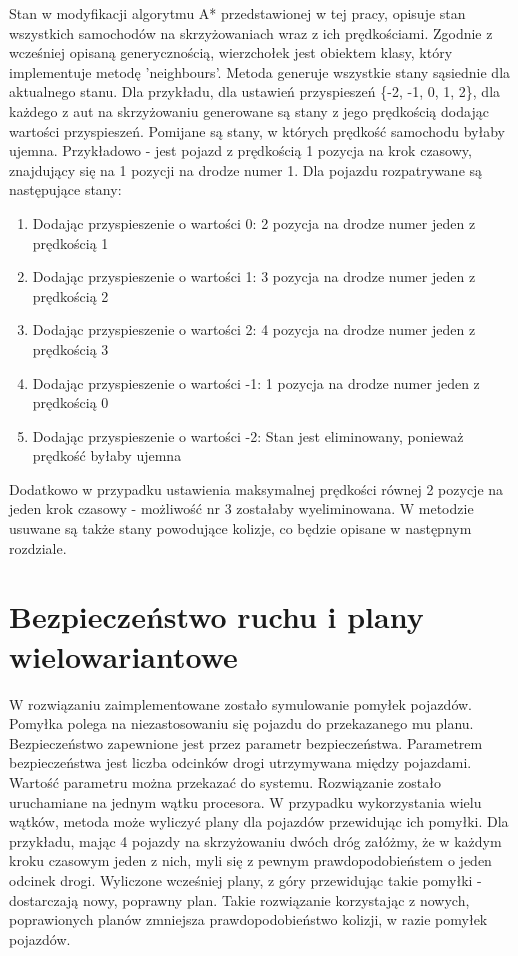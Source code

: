 Stan w modyfikacji algorytmu A* przedstawionej w tej pracy, opisuje stan wszystkich samochodów na skrzyżowaniach wraz z ich prędkościami. Zgodnie z wcześniej opisaną generycznością, wierzchołek jest obiektem klasy, który implementuje metodę 'neighbours'. Metoda generuje wszystkie stany sąsiednie dla aktualnego stanu. Dla przykładu, dla ustawień przyspieszeń \{-2, -1, 0, 1, 2\}, dla każdego z aut na skrzyżowaniu generowane są stany z jego prędkością dodając wartości przyspieszeń. Pomijane są stany, w których prędkość samochodu byłaby ujemna. Przykładowo - jest pojazd z prędkością 1 pozycja na krok czasowy, znajdujący się na 1 pozycji na drodze numer 1. Dla pojazdu rozpatrywane są następujące stany:
\begin{enumerate}
\item Dodając przyspieszenie o wartości 0: 2 pozycja na drodze numer jeden z prędkością 1
\item Dodając przyspieszenie o wartości 1: 3 pozycja na drodze numer jeden z prędkością 2
\item Dodając przyspieszenie o wartości 2: 4 pozycja na drodze numer jeden z prędkością 3
\item Dodając przyspieszenie o wartości -1: 1 pozycja na drodze numer jeden z prędkością 0
\item Dodając przyspieszenie o wartości -2: Stan jest eliminowany, ponieważ prędkość byłaby ujemna
\end{enumerate}
Dodatkowo w przypadku ustawienia maksymalnej prędkości równej 2 pozycje na jeden krok czasowy - możliwość nr 3 zostałaby wyeliminowana.
\newline
\newline
W metodzie usuwane są także stany powodujące kolizje, co będzie opisane w następnym rozdziale.

\section{Bezpieczeństwo ruchu i plany wielowariantowe}

W rozwiązaniu zaimplementowane zostało symulowanie pomyłek pojazdów. Pomyłka polega na niezastosowaniu się pojazdu do przekazanego mu planu. Bezpieczeństwo zapewnione jest przez parametr bezpieczeństwa. Parametrem bezpieczeństwa jest liczba odcinków drogi utrzymywana między pojazdami. Wartość parametru można przekazać do systemu.
\newline
\indent
Rozwiązanie zostało uruchamiane na jednym wątku procesora. W przypadku wykorzystania wielu wątków, metoda może wyliczyć plany dla pojazdów przewidując ich pomyłki. Dla przykładu, mając 4 pojazdy na skrzyżowaniu dwóch dróg załóżmy, że w każdym kroku czasowym jeden z nich, myli się z pewnym prawdopodobieństem o jeden odcinek drogi. Wyliczone wcześniej plany, z góry przewidując takie pomyłki - dostarczają nowy, poprawny plan. Takie rozwiązanie korzystając z nowych, poprawionych planów zmniejsza prawdopodobieństwo kolizji, w razie pomyłek pojazdów.

